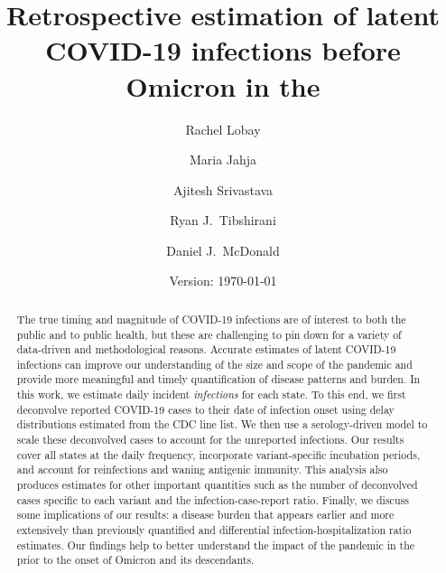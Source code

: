 \documentclass{article}
\begin{document}
\title{Retrospective estimation of latent COVID-19 infections before Omicron in the \US}
\author[a,1]{Rachel Lobay}
\author[b]{Maria Jahja}
\author[c]{Ajitesh Srivastava}
\author[d]{Ryan J.\ Tibshirani}
\author[a]{Daniel J.\ McDonald}





\date{Version: \today}
\maketitle

\begin{abstract}
The true timing and magnitude of COVID-19 infections are of interest to both the
public and to public health, but these are challenging to pin down for a variety
of data-driven and methodological reasons. Accurate estimates of latent COVID-19
infections can improve our understanding of the size and scope of the pandemic
and provide more meaningful and timely quantification of disease patterns and
burden. In this work, we estimate daily incident \emph{infections} for each \US
state. To this end, we first deconvolve reported COVID-19 cases to their date of
infection onset using delay distributions estimated from the CDC line list. We
then use a serology-driven model to scale these deconvolved cases to account for
the unreported infections. Our results cover all states at the daily frequency,
incorporate variant-specific incubation periods, and account for reinfections
and waning antigenic immunity. This analysis also produces estimates for other
important quantities such as the number of deconvolved cases specific to each
variant and the infection-case-report ratio. Finally, we discuss some
implications of our results: a disease burden that appears earlier and more
extensively than previously quantified and differential infection-hospitalization
ratio estimates. Our findings help to better understand the impact of the
pandemic in the \US prior to the onset of Omicron and its descendants. 

\end{abstract}
\end{document}
